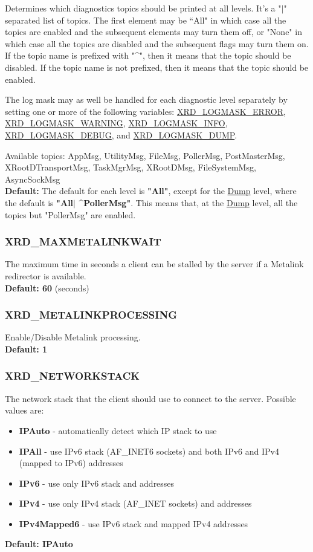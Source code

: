 \documentclass{article}
\begin{document}
			Determines which diagnostics topics should be printed at all levels. It's a "$\vert$" separated list of 
			topics. The first element may be ``All" in which case all the topics are enabled and the subsequent
			elements may turn them off, or "None" in which case all the topics are disabled and the subsequent 
		 	flags may turn them on. If the topic name is prefixed with "\textasciicircum", then it means that the 
		 	topic should be disabled. If the topic name is not prefixed, then it means that the topic should be enabled.
			
		 	The log mask may as well be handled for each diagnostic level separately by setting one or more of 
		 	the following variables: \ul{XRD_LOGMASK_ERROR}, \ul{XRD_LOGMASK_WARNING}, 
		 	\ul{XRD_LOGMASK_INFO}, \ul{XRD_LOGMASK_DEBUG}, and \ul{XRD_LOGMASK_DUMP}. 
		 				
		 	Available topics: AppMsg, UtilityMsg, FileMsg, PollerMsg, PostMasterMsg, XRootDTransportMsg, TaskMgrMsg, 
		 	XRootDMsg, FileSystemMsg, AsyncSock\-Msg \\
		 	\textbf{Default:} The default for each level is	\textbf{"All"}, except for the \ul{Dump} level, where the default 
		 	is \textbf{"All$\vert$ \textasciicircum PollerMsg"}. This means that, at the \ul{Dump} level, all the topics but 
		 	"PollerMsg" are enabled.
		 	
		 	
		\subsubsection{XRD_MAXMETALINKWAIT}
		\label{env:maxmetalinkwait}
		    The maximum time in seconds a client can be stalled by the server if a Metalink redirector is available. \\
		    \textbf{Default: 60} (seconds)
		    
		\subsubsection{XRD_METALINKPROCESSING}
		\label{env:metalinkprocessing}
		    Enable/Disable Metalink processing. \\
		    \textbf{Default: 1}
		    
		\subsubsection{XRD_NETWORKSTACK}
		\label{env:networkstack}
		    The network stack that the client should use to connect to the server. Possible values are:
			\begin{itemize}
		    \item \textbf{IPAuto} - automatically detect which IP stack to use 
		    \item \textbf{IPAll} - use IPv6 stack (AF_INET6 sockets) and both IPv6 and IPv4 (mapped to IPv6) addresses
		    \item \textbf{IPv6} - use only IPv6 stack and addresses
		    \item \textbf{IPv4} - use only IPv4 stack (AF_INET sockets) and addresses
		    \item \textbf{IPv4Mapped6} - use IPv6 stack and mapped IPv4 addresses
		    \end{itemize}
		    \textbf{Default: IPAuto}
		    
\end{document}
